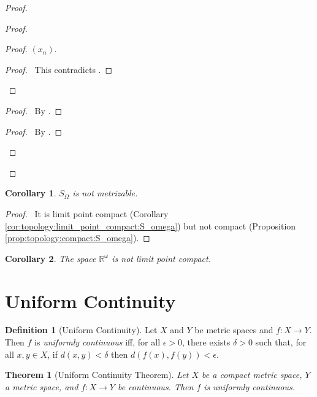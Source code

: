 \documentclass{report}
\let\qed\relax
\newtheorem{thm}[lm]{Theorem}
\newtheorem{cor}{Corollary}[lm]
\theoremstyle{definition}
\newtheorem{df}[lm]{Definition}
\begin{document}
\begin{proof}
\begin{proof}
\begin{proof}
{          $(x_n)$.}
        \qedstep
        \begin{proof}
          \pf\ This contradicts .
        \end{proof}
      \end{proof}
      \begin{proof}
        \pf\ By .
      \end{proof}
      \begin{proof}
        \pf\ By .
      \end{proof}
    \end{proof}
    \qed
  \end{proof}

  \begin{cor}
   $S_\Omega$ is not metrizable.
  \end{cor}

  \begin{proof}
   \pf\ It is limit point compact (Corollary
\ref{cor:topology:limit_point_compact:S_omega}) but not compact (Proposition
\ref{prop:topology:compact:S_omega}). \qed
  \end{proof}

  \begin{cor}
    The space $\mathbb{R}^\omega$ is not limit point compact.
  \end{cor}

  \section{Uniform Continuity}

  \begin{df}[Uniform Continuity]
    Let $X$ and $Y$ be metric spaces and $f : X \rightarrow Y$. Then $f$ is
    \emph{uniformly continuous} iff, for all $\epsilon > 0$, there exists
    $\delta > 0$ such that, for all $x, y \in X$, if $d(x, y) < \delta$ then
    $d(f(x), f(y)) < \epsilon$.
  \end{df}

  \begin{thm}[Uniform Continuity Theorem]
    Let $X$ be a compact metric space, $Y$ a metric space, and $f : X
    \rightarrow Y$ be continuous. Then $f$ is uniformly continuous.
  \end{thm}
\end{document}
